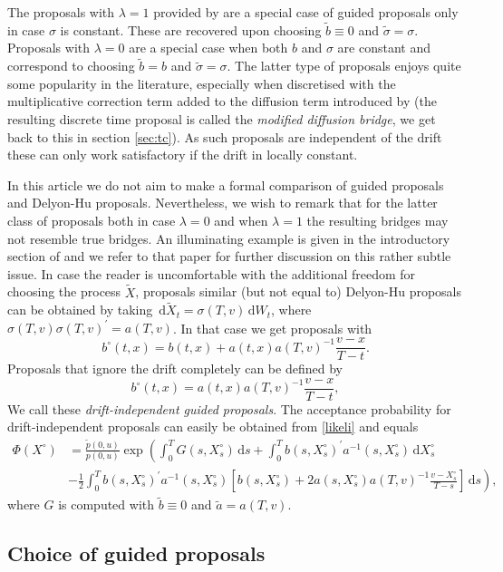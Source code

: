 \documentclass[preprint]{imsart}
\newcommand{\si}{\sigma}
\newcommand{\la}{\lambda}
\renewcommand{\tilde}{\widetilde}
\theoremstyle{definition}
\newcommand{\dd}{{\,\mathrm d}}
\newcommand{\T}{{\prime}}
\begin{document}
The proposals with $\la=1$ provided by \cite{DelyonHu} are a special case of guided proposals only in case $\si$  is constant. These are recovered upon choosing $\tilde{b}\equiv 0$ and $\tilde{\si}=\si$.  Proposals with $\la=0$ are a special case when both $b$ and $\si$ are constant and correspond to choosing $\tilde{b}=b$ and $\tilde{\si}=\si$. The latter type of proposals enjoys  quite some popularity in the literature, especially when discretised with the multiplicative  correction term added to the diffusion term introduced by \cite{DurhamGallant} (the resulting discrete time proposal is called the {\it modified diffusion bridge}, we get back to this in section \ref{sec:tc}). As such proposals are independent of the drift these can only work satisfactory if the drift in locally constant.

 In this article we do not aim to make a formal comparison of guided proposals and Delyon-Hu proposals.  Nevertheless, we wish to remark that for the latter class of proposals  both in case $\la=0$ and when $\la=1$ the resulting bridges  may not resemble true bridges. An illuminating example is given in the introductory section of \cite{Schauer} and we refer to that paper for further discussion on this rather subtle issue.  In case the reader is uncomfortable with the additional freedom for choosing the process $\tilde{X}$,  proposals similar (but not equal to) Delyon-Hu proposals can be obtained by taking $\dd \tilde{X}_t=\si(T,v) \dd W_t$, where $\si(T,v)\si(T,v)^\T=a(T,v)$. In that case we get proposals with
\[  b^\circ(t,x)= b(t,x)+ a(t,x) a(T,v)^{-1} \frac{v-x}{T-t}. \]
Proposals that ignore the drift completely can be  defined by \[ b^\circ(t,x)= a(t,x) a(T,v)^{-1} \frac{v-x}{T-t}, \]
We call these {\it drift-independent guided proposals}. 
The acceptance probability for drift-independent proposals can easily be obtained from \eqref{likeli} and equals
\begin{align*} \Phi(X^\circ)&= \frac{\tilde{p}(0,u)}{p(0,u)} \exp\left( \int_0^T G(s,X^\circ_s) \dd s+ \int_0^T b(s, X^\circ_s)^\T a^{-1}(s,X^\circ_s) \dd X^\circ_s\right. \\ & \left.  - \frac12 \int_0^T b(s, X^\circ_s)^\T a^{-1}(s,X^\circ_s)\left[b(s, X^\circ_s)+2 a(s,X^\circ_s) a(T,v)^{-1} \frac{v-X^\circ_s}{T-s}\right] \dd s \right),
\end{align*}
where $G$ is computed with $\tilde{b}\equiv 0$ and $\tilde{a}=a(T,v)$.


\subsection{Choice of guided proposals}\label{sec:choiceguided}
\end{document}
